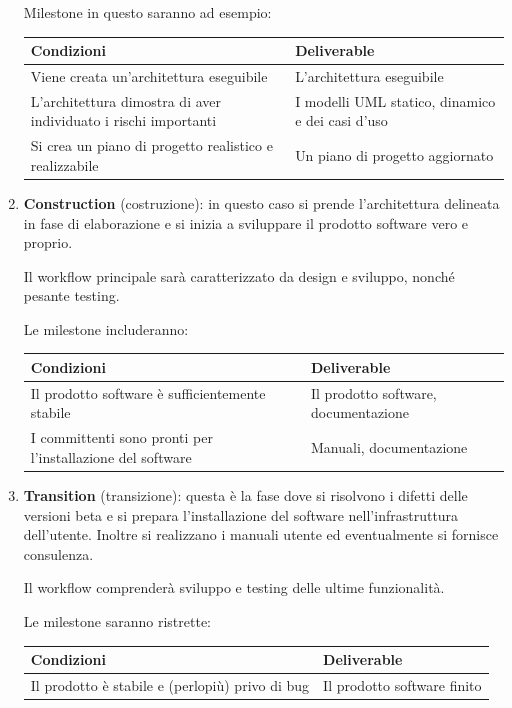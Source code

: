 \documentclass[a4paper,11pt]{article}
\begin{document}
\begin{enumerate}
	Milestone in questo saranno ad esempio:
	\begin{table}[H]
	\center {}
	\begin{tabular} { p{7cm} | p{7cm} }
		\bfseries Condizioni & \bfseries Deliverable \\
		\hline
		Viene creata un'architettura eseguibile & L'architettura eseguibile \\ 
		L'architettura dimostra di aver individuato i rischi importanti & I modelli UML statico, dinamico e dei casi d'uso \\
		Si crea un piano di progetto realistico e realizzabile & Un piano di progetto aggiornato \\
	\end{tabular}
\end{table}

	\item \textbf{Construction} (costruzione): in questo caso si prende l'architettura delineata in fase di elaborazione e si inizia a sviluppare il prodotto software vero e proprio.

	Il workflow principale sarà caratterizzato da design e sviluppo, nonché pesante testing.
		
	Le milestone includeranno:
	\begin{table}[H]
	\center {}
	\begin{tabular} { p{7cm} | p{7cm} }
		\bfseries Condizioni & \bfseries Deliverable \\
		\hline
		Il prodotto software è sufficientemente stabile & Il prodotto software, documentazione \\
		I committenti sono pronti per l'installazione del software & Manuali, documentazione
	\end{tabular}
\end{table}

	\item \textbf{Transition} (transizione): questa è la fase dove si risolvono i difetti delle versioni beta e si prepara l'installazione del software nell'infrastruttura dell'utente. Inoltre si realizzano i manuali utente ed eventualmente si fornisce consulenza.

		Il workflow comprenderà sviluppo e testing delle ultime funzionalità.

	Le milestone saranno ristrette: 
	\begin{table}[H]
	\center {}
	\begin{tabular} { p{7cm} | p{7cm} }
		\bfseries Condizioni & \bfseries Deliverable \\
		\hline
		Il prodotto è stabile e (perlopiù) privo di bug & Il prodotto software finito
	\end{tabular}
\end{table}

\end{enumerate}
\end{document}
